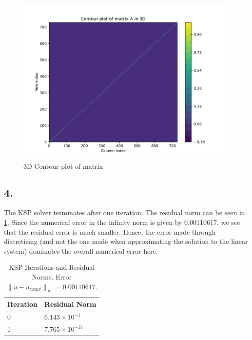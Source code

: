\begin{figure}[h!]
\includegraphics[width=\textwidth]{contour_plot3D.pdf}
\caption{3D Contour plot of matrix}
\label{fig:contour1D}
\end{figure}


\FloatBarrier


\subsection*{4.}
\FloatBarrier
The KSP solver terminates after one iteration. The residual norm can be seen in \cref{iters}. Since the numerical error in the infinity norm is given by 0.00110617, we see that the residual error is much smaller. Hence, the error made through discretising (and not the one made when approximating the solution to the linear system) dominates the overall numerical error here.
\begin{table}[h!]
\centering
\begin{tabular}{|l|l|}
\hline
\textbf{Iteration} & \textbf{Residual Norm} \\ \hline
0 & $6.143 \times 10^{-1}$ \\ \hline
1 & $7.765 \times 10^{-17}$ \\ \hline
\end{tabular}
\caption{KSP Iterations and Residual Norms. Error $\|u-u_{exact}\|_\infty = 0.00110617$.}
\label{iters}
\end{table}



\FloatBarrier

